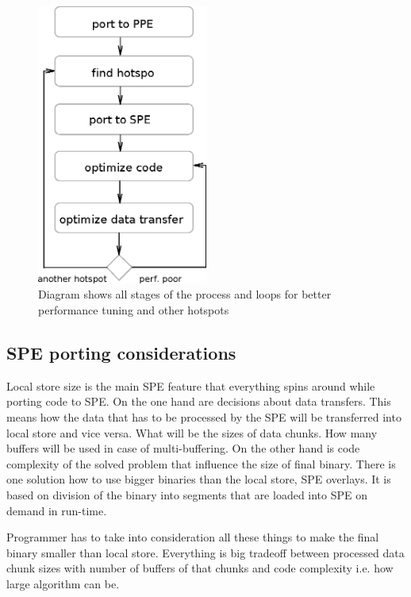 \begin{figure}
    \centering
    \includegraphics[width=0.5\textwidth]{data/portingCycle}
    \caption[Application porting cycle]{Diagram shows all stages of the process and loops for better performance tuning and other hotspots}
    \label{fg:appPorting}
\end{figure}

\subsection {SPE porting considerations}

\par
Local store size is the main SPE feature that everything spins around while porting code to SPE.
On the one hand are decisions about data transfers.
This means how the data that has to be processed by the SPE will be transferred into local store and vice versa.
What will be the sizes of data chunks.
How many buffers will be used in case of multi-buffering.
On the other hand is code complexity of the solved problem that influence the size of final binary.
There is one solution how to use bigger binaries than the local store, SPE overlays.
It is based on division of the binary into segments that are loaded into SPE on demand in run-time.

\par
Programmer has to take into consideration all these things to make the final binary smaller than local store.
Everything is big tradeoff between processed data chunk sizes with number of buffers of that chunks and code complexity i.e. how large algorithm can be.


